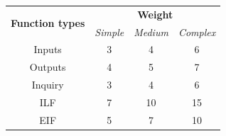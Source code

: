 \begin{table}[H]
    \centering
    \begin{tabular}{|c|ccc|}
    \hline
    \multirow{2}{*}{\textbf{Function types}} & \multicolumn{3}{c|}{\textbf{Weight}}                                                           \\ \cline{2-4} 
                                             & \multicolumn{1}{c|}{\textit{Simple}} & \multicolumn{1}{c|}{\textit{Medium}} & \textit{Complex} \\ \hline
    Inputs                                   & \multicolumn{1}{c|}{3}               & \multicolumn{1}{c|}{4}               & 6                \\
    Outputs                                  & \multicolumn{1}{c|}{4}               & \multicolumn{1}{c|}{5}               & 7                \\
    Inquiry                                  & \multicolumn{1}{c|}{3}               & \multicolumn{1}{c|}{4}               & 6                \\
    ILF                                      & \multicolumn{1}{c|}{7}               & \multicolumn{1}{c|}{10}              & 15               \\
    EIF                                      & \multicolumn{1}{c|}{5}               & \multicolumn{1}{c|}{7}               & 10               \\ \hline
    \end{tabular}
\end{table}
